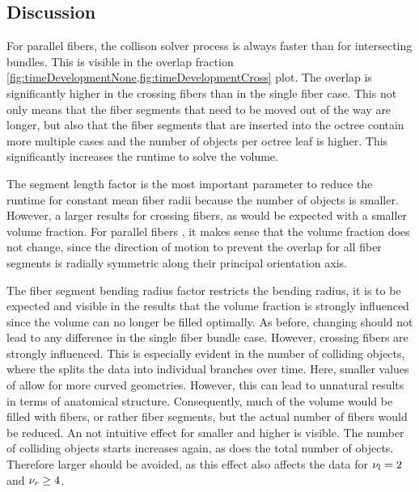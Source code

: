 \subsection{Discussion}
%
For parallel fibers, the collison solver process is always faster than for intersecting bundles.
This is visible in the overlap fraction \cref{fig:timeDevelopmentNone,fig:timeDevelopmentCross} plot.
The overlap is significantly higher in the crossing fibers than in the single fiber case.
This not only means that the fiber segments that need to be moved out of the way are longer, but also that the fiber segments that are inserted into the octree contain more multiple cases and the number of objects per octree leaf is higher.
This significantly increases the runtime to solve the volume.
\par
%
The segment length factor \segLengthFactor{} is the most important parameter to reduce the runtime for constant mean fiber radii \fiberRadiusMean{} because the number of objects is smaller.
However, a larger \segLengthFactor{} results for crossing fibers, as would be expected with a smaller volume fraction.
For parallel fibers \pfbs{}, it makes sense that the volume fraction does not change, since the direction of motion to prevent the overlap for all fiber segments is radially symmetric along their principal orientation axis.
\par
%
The fiber segment bending radius factor \segRadiusFactor{} restricts the bending radius, it is to be expected and visible in the results that the volume fraction is strongly influenced since the volume can no longer be filled optimally.
As before, changing \segRadiusFactor{} should not lead to any difference in the single fiber bundle case.
However, crossing fibers are strongly influenced.
This is especially evident in the number of colliding objects, where the \segRadiusFactor{} splits the data into individual branches over time.
Here, smaller values of \segRadiusFactor{} allow for more curved geometries.
However, this can lead to unnatural results in terms of anatomical structure.
Consequently, much of the volume would be filled with fibers, or rather fiber segments, but the actual number of fibers would be reduced.
An not intuitive effect for smaller \segLengthFactor{} and higher \segRadiusFactor{} is visible.
The number of colliding objects starts increases again, as does the total number of objects.
Therefore larger \segRadiusFactor{} should be avoided, as this effect also affects the data for $\textnormal{$\nu_{l}$} = 2$ and $\textnormal{$\nu_{r}$} \geq 4$.

